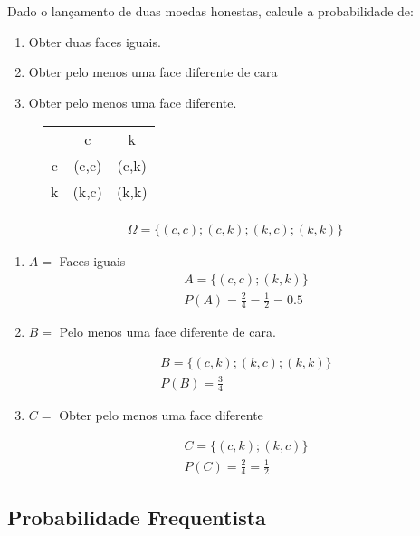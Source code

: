 \begin{example}
    Dado o lançamento de duas moedas honestas, calcule a probabilidade de: 
    \begin{enumerate}[label=(\alph*)]
      \item  Obter duas faces iguais.
      \item Obter pelo menos uma face diferente de cara
      \item  Obter pelo menos uma face diferente.
    \end{enumerate}
    \begin{figure} [H]
      \centering
      \begin{tabular}{c c c}
        \toprule
        &c&k\\ \cmidrule{2-3}
        c&(c,c)&(c,k)\\ \cmidrule{2-3}
        k&(k,c)&(k,k)\\    \bottomrule
      \end{tabular}
      \label{tab:1}
    \end{figure}
    \begin{align*}    \Omega = \{ (c,c); (c,k) ; (k,c) ; (k,k)\}
    \end{align*}
    \begin{enumerate}[label=(\alph*)]
      \item $A=$ Faces iguais
        \begin{align*}
          A= \{ (c,c) ; (k,k) \} \\
          P(A) = \frac{2}{4} = \frac{1}{2}= 0.5
        \end{align*}
      \item $B=$ Pelo menos uma face diferente de cara.

        \begin{align*}
          B= \{ (c,k) ; (k,c) ; (k,k) \} \\
          P(B)= \frac{3}{4}
        \end{align*}

      \item $C=$ Obter pelo menos uma face diferente

        \begin{align*}
          C= \{ (c,k) ; (k,c) \} \\
          P(C)= \frac{2}{4}= \frac{1}{2}
        \end{align*}
    \end{enumerate}
  \end{example}
\subsection{Probabilidade Frequentista}


